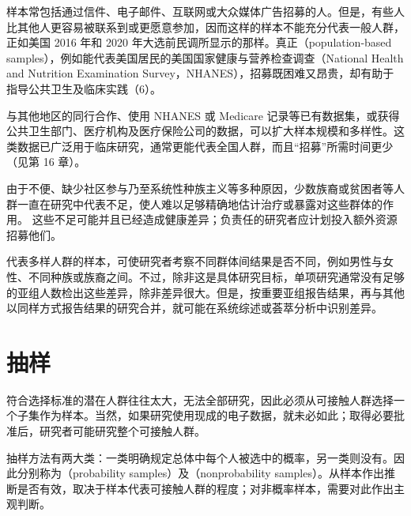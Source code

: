 样本常包括通过信件、电子邮件、互联网或大众媒体广告招募的人。但是，有些人比其他人更容易被联系到或更愿意参加，因而这样的样本不能充分代表一般人群，正如美国 2016 年和 2020 年大选前民调所显示的那样。真正（population-based samples），例如能代表美国居民的美国国家健康与营养检查调查（National Health and Nutrition Examination Survey，NHANES），招募既困难又昂贵，却有助于指导公共卫生及临床实践（6）。

与其他地区的同行合作、使用 NHANES 或 Medicare 记录等已有数据集，或获得公共卫生部门、医疗机构及医疗保险公司的数据，可以扩大样本规模和多样性。这类数据已广泛用于临床研究，通常更能代表全国人群，而且“招募”所需时间更少（见第 16 章）。

由于不便、缺少社区参与乃至系统性种族主义等多种原因，少数族裔或贫困者等人群一直在研究中代表不足，使人难以足够精确地估计治疗或暴露对这些群体的作用。
这些不足可能并且已经造成健康差异；负责任的研究者应计划投入额外资源招募他们。

代表多样人群的样本，可使研究者考察不同群体间结果是否不同，例如男性与女性、不同种族或族裔之间。不过，除非这是具体研究目标，单项研究通常没有足够的亚组人数检出这些差异，除非差异很大。但是，按重要亚组报告结果，再与其他以同样方式报告结果的研究合并，就可能在系统综述或荟萃分析中识别差异。

\section{抽样}
符合选择标准的潜在人群往往太大，无法全部研究，因此必须从可接触人群选择一个子集作为样本。当然，如果研究使用现成的电子数据，就未必如此；取得必要批准后，研究者可能研究整个可接触人群。

抽样方法有两大类：一类明确规定总体中每个人被选中的概率，另一类则没有。因此分别称为（probability samples）及（nonprobability samples）。从样本作出推断是否有效，取决于样本代表可接触人群的程度；对非概率样本，需要对此作出主观判断。


